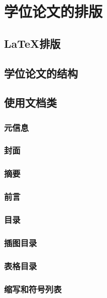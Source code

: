 \chapter{学位论文的排版}

\section{{\LaTeX}排版}


\section{学位论文的结构}


\section{使用文档类}

\subsection{元信息}

\subsection{封面}

\subsection{摘要}

\subsection{前言}

\subsection{目录}

\subsection{插图目录}

\subsection{表格目录}

\subsection{缩写和符号列表}

